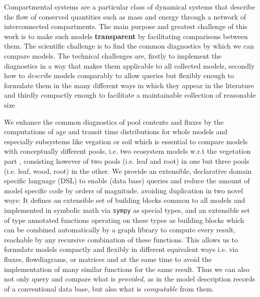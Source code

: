 
Compartmental systems are a particular class of dynamical systems that describe
the flow of conserved quantities such as mass and energy through a network of
interconnected compartments.  The main purpose and greatest challenge of this
work is to make such models {\bf transparent} by  facilitating  comparisons
between them.  The scientific challenge is to find the common
diagnostics by which we can compare models. The technical challenges are,
firstly to implement the diagnostics in a way that makes them applicable to all collected
models, secondly how to \emph{describe} models comparably to allow queries but flexibly enough 
to formulate them in the many different
ways in which they appear in the literature and thirdly compactly enough to facilitate a maintainable collection of reasonable size 

We enhance the common diagnostics of pool contents and fluxes by the 
computations of age and transit time distributions for whole models and
especially subsystems like vegation or soil which is essential 
to compare models with conceptually different pools, i.e. two ecosystem models
w.r.t the vegetation part , consisting however of two pools
(i.e. leaf and root) in one but three pools (i.e. leaf, wood, root) in the
other.  
We provide an extensible, declarative domain specific language (DSL) to enable (data base) queries and reduce the amount of model specific code by orders of magnitude. 
avoiding duplication in two novel ways: It defines an extensible set of 
building blocks common to all models and implemented in symbolic math via \texttt{sympy} as special types, and an extensible set of type annotated functions operating on these types as 
building blocks which can be combined automatically by a graph library to compute every result,
reachable by any recursive combination of these functions. 
This allows us to formulate models compactly and
flexibly in different equivalent ways i.e. via fluxes, flowdiagrams, or
matrices and at the same time to avoid the implementation of many similar
functions for the same result.  Thus we can also not only query and compare
what is \emph{provided}, as in the model description records of a conventional data
base, but also what is \emph{computable} from them.  

